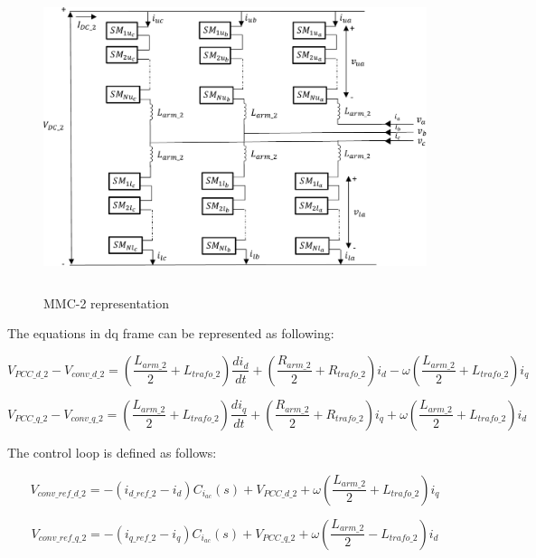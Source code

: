 \begin{figure}[H]
\centering
    \includegraphics[height = 9cm,width = 13.5cm]{Diagrams/Chapter_4/MMC_pow_system_2.pdf}
    \caption{MMC-2 representation \cite{saad2015modelisation}}
    \label{fig:MMC_pow_system_2}
\end{figure}

The equations in \gls{dq} frame can be represented as following:

\begin{equation}
    V_{PCC\_d\_2} - V_{conv\_d\_2} = \left(\frac{L_{arm\_2}}{2} + L_{trafo\_2}\right)\frac{di_{d}}{dt} +\left (\frac{R_{arm\_2}}{2}+R_{trafo\_2}\right)i_d-\omega\left(\frac{L_{arm\_2}}{2}+L_{trafo\_2}\right)i_q
\end{equation}

\begin{equation}
    V_{PCC\_q\_2} - V_{conv\_q\_2} = \left(\frac{L_{arm\_2}}{2} + L_{trafo\_2}\right)\frac{di_{q}}{dt} +\left (\frac{R_{arm\_2}}{2}+R_{trafo\_2}\right)i_q+\omega\left(\frac{L_{arm\_2}}{2}+L_{trafo\_2}\right)i_d
\end{equation}

The control loop is defined as follows:

\begin{equation}
    V_{conv\_ref\_d\_2} = - \left(i_{d\_ref\_2} - i_d\right)C_{i_{ac}}\left(s\right) + V_{PCC\_d\_2} + \omega\left(\frac{L_{arm\_2}}{2}+L_{trafo\_2}\right)i_q
\end{equation}

\begin{equation}
    V_{conv\_ref\_q\_2} = - \left(i_{q\_ref\_2} - i_q\right)C_{i_{ac}}\left(s\right) + V_{PCC\_q\_2} + \omega\left(\frac{L_{arm\_2}}{2}-L_{trafo\_2}\right)i_d
\end{equation}

